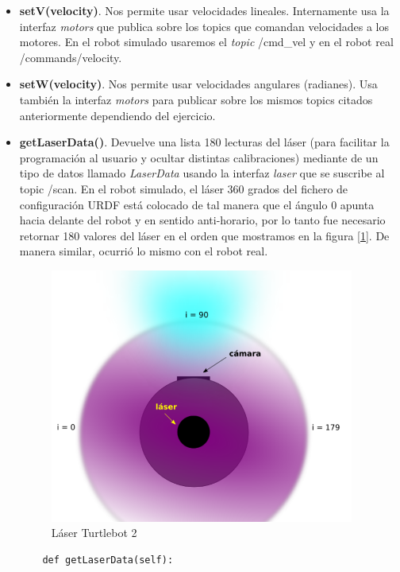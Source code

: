 \begin{itemize}
	\item \textbf{setV(velocity)}. Nos permite usar velocidades lineales. Internamente usa la interfaz \textit{motors} que publica sobre los topics que comandan velocidades a los motores. En el robot simulado usaremos el \textit{topic} /cmd\_vel y en el robot real /commands/velocity.
	\item \textbf{setW(velocity)}. Nos permite usar velocidades angulares (radianes). Usa también la interfaz \textit{motors} para publicar sobre los mismos topics citados anteriormente dependiendo del ejercicio.
	\item \textbf{getLaserData()}. Devuelve una lista 180 lecturas del láser (para facilitar la programación al usuario y ocultar distintas calibraciones) mediante de un tipo de datos llamado \textit{LaserData} usando la interfaz \textit{laser} que se suscribe al topic /scan. En el robot simulado, el láser 360 grados del fichero de configuración URDF está colocado de tal manera que el ángulo 0 apunta hacia delante del robot y en sentido anti-horario, por lo tanto fue necesario retornar 180 valores del láser en el orden que mostramos en la figura [\ref{fig:vista_planta_turtlebot2}]. De manera similar, ocurrió lo mismo con el robot real.
\begin{figure} [H]
  \begin{center}
    \includegraphics[width=10cm]{imagenes/vista-planta-turtlebot2.png}
  \end{center}
  \caption[Láser Turtlebot 2]{Láser Turtlebot 2}
  \label{fig:vista_planta_turtlebot2}
\end{figure}
\begin{code}[H]
	\begin{lstlisting}
	def getLaserData(self):

\end{lstlisting}
\end{code}
\end{itemize}
